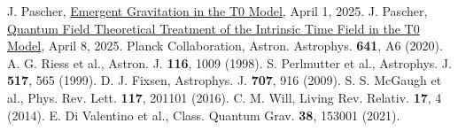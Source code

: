 \documentclass[twocolumn,aps,prl]{revtex4-2}
\begin{document}
\begin{thebibliography}{99}
		 J. Pascher, \href{https://github.com/jpascher/T0-Time-Mass-Duality/tree/main/2/pdf/English/Emergente Gravitation im T0-Modell Eine formale Herleitung_en.pdf}{Emergent Gravitation in the T0 Model}, April 1, 2025.
		 J. Pascher, \href{https://github.com/jpascher/T0-Time-Mass-Duality/tree/main/2/pdf/English/Quantum Field Theoretical Treatment of the Intrinsic Time Field in the T0 Model_en.pdf}{Quantum Field Theoretical Treatment of the Intrinsic Time Field in the T0 Model}, April 8, 2025.
		 Planck Collaboration, Astron. Astrophys. \textbf{641}, A6 (2020).
		 A. G. Riess et al., Astron. J. \textbf{116}, 1009 (1998).
		 S. Perlmutter et al., Astrophys. J. \textbf{517}, 565 (1999).
		 D. J. Fixsen, Astrophys. J. \textbf{707}, 916 (2009).
		 S. S. McGaugh et al., Phys. Rev. Lett. \textbf{117}, 201101 (2016).
		 C. M. Will, Living Rev. Relativ. \textbf{17}, 4 (2014).
		 E. Di Valentino et al., Class. Quantum Grav. \textbf{38}, 153001 (2021).
	\end{thebibliography}
	
\end{document}
